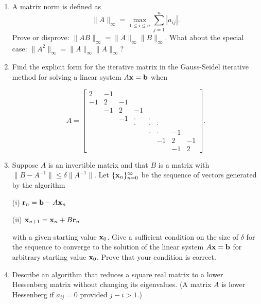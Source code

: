 \documentclass{article}
\begin{document}
\begin{large}
\begin{enumerate}
\item
 A matrix norm is defined as
\[  \| A\|_{\infty}  = \max_{1\leq i \leq n} \sum_{j=1}^n |a_{ij}| . \]
Prove or disprove: $ \| AB \|_{\infty} = \|A\|_{\infty} \|B\|_{\infty}$.
What about the special case:  $\| A^2 \|_{\infty} =
\|A\|_{\infty} \|A\|_{\infty}$?



 \item Find the explicit form for the iterative matrix in the 
Gauss-Seidel iterative method for solving a linear system
$A {\bf x} = {\bf b}$ when

\[ A =  \left[ \begin{array}{rrrrrrrr}
            2    &-1  &     & & & & &      \\
           -1    &2  &-1                           \\
                 &-1 &2     &-1                     \\
                 &   &-1 &\cdot  &\cdot          \\                       
                 &   &   &\cdot &\cdot  &\cdot       \\                      
                 &   &  &      &\cdot &\cdot  &-1    \\                
                 &   &  &      &   &-1 &2  &-1       \\                      
                 &   &  &      &   &  &-1 &2  
         \end{array}    \right] .              \]

\item Suppose $A$ is an invertible matrix and that $B$ is a 
 matrix with
$ \|B - A^{-1}\| \leq \delta \| A^{-1} \| $. Let $\{ {\bf x}_n 
\}_{n=0}^{\infty} $ be the sequence of vectors generated by the algorithm

\hspace{1in} (i) ${\bf r}_n = {\bf b} - A {\bf x}_n$

\hspace{1in} (ii) ${\bf x}_{n+1}={\bf x}_n + B {\bf r}_n$

with a given starting value ${\bf x}_0$. Give a sufficient condition on 
the size of $\delta$ for 
the sequence to converge to the solution of the linear system
$A{\bf x} = {\bf b} $ for arbitrary starting value 
${\bf x}_0$. Prove that your 
condition is correct.

\item Describe an algorithm that reduces a square real matrix to
a lower Hessenberg matrix without changing its eigenvalues.
(A matrix $A$ is lower Hessenberg if $a_{ij}=0$ provided $j-i > 1$.)




 \end{enumerate}

\end{large}
\end{document}
